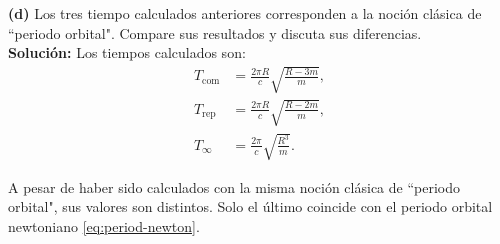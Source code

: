 \documentclass[letterpaper,11pt]{article}
\begin{document}
\textbf{(d)} Los tres tiempo calculados anteriores corresponden a la noción clásica de ``periodo orbital". Compare sus resultados y discuta sus diferencias.
\\

\textbf{Solución:} Los tiempos calculados son:
\begin{align}
T_{\text{com}} &= \frac{2\pi R}{c} \sqrt{\frac{R-3m}{m}}, \\
T_{\text{rep}} &= \frac{2\pi R}{c} \sqrt{\frac{R-2m}{m}}, \\
T_{\infty} &= \frac{2\pi}{c} \sqrt{\frac{R^3}{m}}.
\end{align}

A pesar de haber sido calculados con la misma noción clásica de ``periodo orbital", sus valores son distintos. Solo el último coincide con el periodo orbital newtoniano \eqref{eq:period-newton}.
\end{document}
